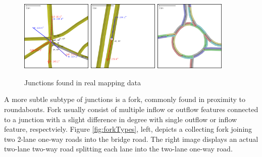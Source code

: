 \begin{figure}[h]
    \caption{Junctions found in real mapping data}
    \label{fig:junctionTypes}
    \centering
    \includegraphics[width=0.3\textwidth]{figs/junction/junction_5_roads.png}
    \hspace{0.2em}
    \includegraphics[width=0.3\textwidth]{figs/junction/junction_two_roads.png}
    \hspace{0.2em}
    \includegraphics[width=0.3\textwidth]{figs/junction/roundabout.png}
\end{figure}

A more subtle subtype of junctions is a fork, commonly found in proximity to roundabouts. Fork usually consist of multiple inflow or outflow features connected to a junction with a slight difference in degree with single outflow or inflow feature, respectviely. Figure \ref{fig:forkTypes}, left, depicts a collecting fork joining two 2-lane one-way roads into the bridge road. The right image displays an actual two-lane two-way road splitting each lane into the two-lane one-way road.

